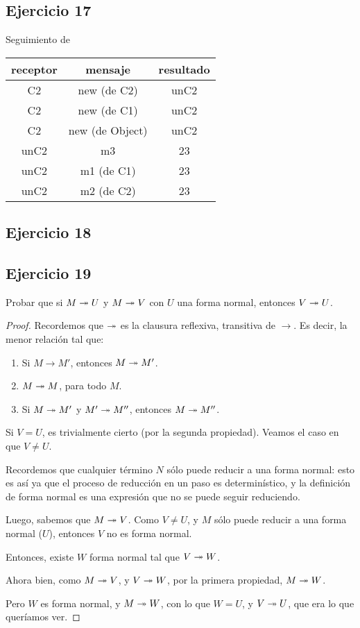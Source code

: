 \subsection*{Ejercicio 17}

Seguimiento de 

\begin{tabular}{| c | c | c |}
  \hline
  receptor & mensaje & resultado \\ \hline
  C2 & new (de C2) & unC2 \\
  C2 & new (de C1) & unC2 \\
  C2 & new (de Object) & unC2 \\
  unC2 & m3 & 23 \\
  unC2 & m1 (de C1) & 23 \\
  unC2 & m2 (de C2) & 23 \\
  \hline
\end{tabular}

\subsection*{Ejercicio 18}


\subsection*{Ejercicio 19}

Probar que si $M \twoheadrightarrow U$ y $M \twoheadrightarrow V$ con $U$ una forma normal, entonces $V \twoheadrightarrow U$.

\begin{proof}
  Recordemos que $\twoheadrightarrow$ es la clausura reflexiva, transitiva de $\to$. Es decir, la menor relación tal que:
  \begin{enumerate}
    \item Si $M\to M'$, entonces $M\twoheadrightarrow M'$.
    \item $M\twoheadrightarrow M$, para todo $M$.
    \item Si $M \twoheadrightarrow M'$ y $M' \twoheadrightarrow M''$, entonces $M \twoheadrightarrow M''$.
  \end{enumerate}

  Si $V = U$, es trivialmente cierto (por la segunda propiedad). Veamos el caso en que $V \neq U$.

  Recordemos que cualquier término $N$ sólo puede reducir a una forma normal: esto es así ya que el proceso de reducción en un paso es determinístico, y la definición de forma normal es una expresión que no se puede seguir reduciendo.

  Luego, sabemos que $M \twoheadrightarrow V$. Como $V \neq U$, y $M$ sólo puede reducir a una forma normal ($U$), entonces $V$ no es forma normal.

  Entonces, existe $W$ forma normal tal que $V \twoheadrightarrow W$.

  Ahora bien, como $M \twoheadrightarrow V$, y $V \twoheadrightarrow W$, por la primera propiedad, $M \twoheadrightarrow W$.

  Pero $W$ es forma normal, y $M \twoheadrightarrow W$, con lo que $W = U$, y $V \twoheadrightarrow U$, que era lo que queríamos ver.
\end{proof}

